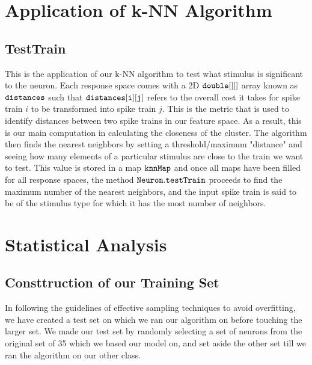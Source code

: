 \documentclass[12pt]{article} %
\begin{document}
\section{Application of k-NN Algorithm}
\subsection{TestTrain}
This is the application of our k-NN algorithm to test what stimulus is significant to the neuron. Each response space comes with a 2D $\tt{double[][]}$ array known as $\tt{distances}$ such that $\tt{distances[i][j]}$ refers to the overall cost it takes for spike train $i$ to be transformed into spike train $j$. This is the metric that is used to identify distances between two spike trains in our feature space. As a result, this is our main computation in calculating the closeness of the cluster. The algorithm then finds the nearest neighbors by setting a threshold/maximum "distance" and seeing how many elements of a particular stimulus are close to the train we want to test. This value is stored in a map $\tt{knnMap}$ and once all maps have been filled for all response spaces, the method $\tt{Neuron.testTrain}$ proceeds to find the maximum number of the nearest neighbors, and the input spike train is said to be of the stimulus type for which it has the most number of neighbors.


\section{Statistical Analysis}
\subsection{Consttruction of our Training Set}
In following the guidelines of effective sampling techniques to avoid overfitting, we have created a test set on which we ran our algorithm on before touching the larger set. We made our test set by randomly selecting a set of neurons from the original set of 35 which we based our model on, and set aside the other set till we ran the algorithm on our other class. 
\end{document}
